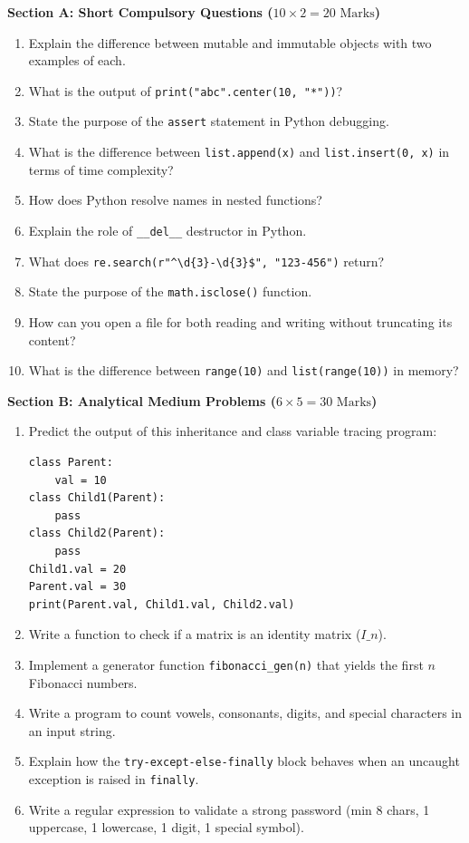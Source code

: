 \begin{mockexam}
\noindent\textbf{Section A: Short Compulsory Questions ($10 \times 2 = 20\text{ Marks}$)}
\begin{enumerate}[leftmargin=1.5em]
    \item Explain the difference between mutable and immutable objects with two examples of each.
    \item What is the output of \texttt{print("abc".center(10, "*"))}?
    \item State the purpose of the \texttt{assert} statement in Python debugging.
    \item What is the difference between \texttt{list.append(x)} and \texttt{list.insert(0, x)} in terms of time complexity?
    \item How does Python resolve names in nested functions?
    \item Explain the role of \texttt{\_\_del\_\_} destructor in Python.
    \item What does \texttt{re.search(r"\textasciicircum\textbackslash d\{3\}-\textbackslash d\{3\}\$", "123-456")} return?
    \item State the purpose of the \texttt{math.isclose()} function.
    \item How can you open a file for both reading and writing without truncating its content?
    \item What is the difference between \texttt{range(10)} and \texttt{list(range(10))} in memory?
\end{enumerate}

\medskip
\noindent\textbf{Section B: Analytical Medium Problems ($6 \times 5 = 30\text{ Marks}$)}
\begin{enumerate}[leftmargin=1.5em, start=11]
    \item Predict the output of this inheritance and class variable tracing program:
    \begin{lstlisting}[language=Python3]
class Parent:
    val = 10
class Child1(Parent):
    pass
class Child2(Parent):
    pass
Child1.val = 20
Parent.val = 30
print(Parent.val, Child1.val, Child2.val)
    \end{lstlisting}
    \item Write a function to check if a matrix is an identity matrix ($I\_n$).
    \item Implement a generator function \texttt{fibonacci\_gen(n)} that yields the first $n$ Fibonacci numbers.
    \item Write a program to count vowels, consonants, digits, and special characters in an input string.
    \item Explain how the \texttt{try-except-else-finally} block behaves when an uncaught exception is raised in \texttt{finally}.
    \item Write a regular expression to validate a strong password (min 8 chars, 1 uppercase, 1 lowercase, 1 digit, 1 special symbol).
\end{enumerate}


\end{mockexam}
